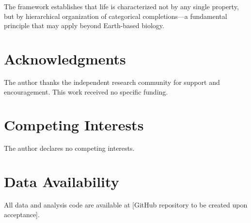 \documentclass[11pt]{article}
\begin{document}
The framework establishes that life is characterized not by any single property, but by hierarchical organization of categorical completions—a fundamental principle that may apply beyond Earth-based biology.

\section*{Acknowledgments}

The author thanks the independent research community for support and encouragement. This work received no specific funding.

\section*{Competing Interests}

The author declares no competing interests.

\section*{Data Availability}

All data and analysis code are available at [GitHub repository to be created upon acceptance].
\end{document}
